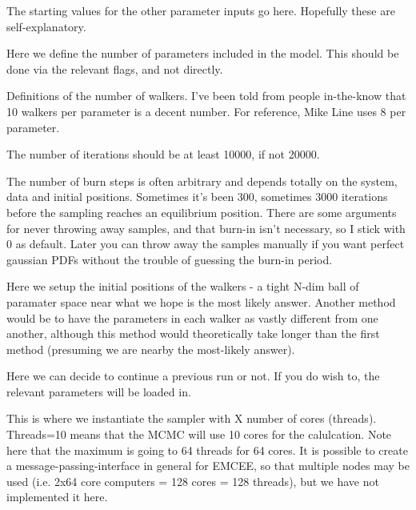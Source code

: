 \documentclass[11pt, a4paper,titlepage]{report}
\begin{document}


The starting values for the other parameter inputs go here. Hopefully these are self-explanatory. 



Here we define the number of parameters included in the model. This should be done via the relevant flags, and not directly.



Definitions of the number of walkers. I've been told from people in-the-know that 10 walkers per parameter is a decent number. For reference, Mike Line uses 8 per parameter. 

The number of iterations should be at least 10000, if not 20000. 

The number of burn steps is often arbitrary and depends totally on the system, data and initial positions. Sometimes it's been 300, sometimes 3000 iterations before the sampling reaches an equilibrium position. There are some arguments for never throwing away samples, and that burn-in isn't necessary, so I stick with 0 as default. Later you can throw away the samples manually if you want perfect gaussian PDFs without the trouble of guessing the burn-in period.



Here we setup the initial positions of the walkers - a tight N-dim ball of paramater space near what we hope is the most likely answer. Another method would be to have the parameters in each walker as vastly different from one another, although this method would theoretically take longer than the first method (presuming we are nearby the most-likely answer). 



Here we can decide to continue a previous run or not. If you do wish to, the relevant parameters will be loaded in. 



This is where we instantiate the sampler with X number of cores (threads). Threads=10 means that the MCMC will use 10 cores for the calulcation. Note here that the maximum is going to 64 threads for 64 cores. It is possible to create a message-passing-interface in general for EMCEE, so that multiple nodes may be used (i.e. 2x64 core computers = 128 cores = 128 threads), but we have not implemented it here.
\end{document}
